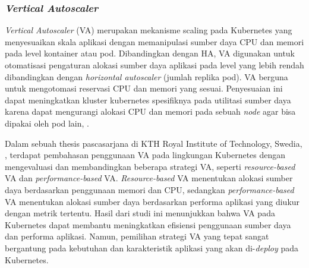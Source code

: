 \subsubsection{\textit{Vertical Autoscaler}}
\textit{Vertical Autoscaler} (VA) merupakan mekanisme scaling pada Kubernetes yang menyesuaikan skala aplikasi dengan memanipulasi sumber daya CPU dan memori pada level kontainer atau pod.
Dibandingkan dengan HA, VA digunakan untuk otomatisasi pengaturan alokasi sumber daya aplikasi pada level yang lebih rendah dibandingkan dengan \textit{horizontal autoscaler} (jumlah replika pod).
VA berguna untuk mengotomasi reservasi CPU dan memori yang sesuai. 
Penyesuaian ini dapat meningkatkan kluster kubernetes spesifiknya pada utilitasi sumber daya karena dapat mengurangi alokasi CPU dan memori pada sebuah \textit{node} agar bisa dipakai oleh pod lain, \parencite{vpa2}.

Dalam sebuah thesis pascasarjana di KTH Royal Institute of Technology, Swedia, \parencite{predictiveva}, terdapat pembahasan penggunaan VA pada lingkungan Kubernetes dengan mengevaluasi dan membandingkan beberapa strategi VA, seperti \textit{resource-based} VA dan \textit{performance-based} VA. \textit{Resource-based} VA menentukan alokasi sumber daya berdasarkan penggunaan memori dan CPU, sedangkan \textit{performance-based} VA menentukan alokasi sumber daya berdasarkan performa aplikasi yang diukur dengan metrik tertentu. Hasil dari studi ini menunjukkan bahwa VA pada Kubernetes dapat membantu meningkatkan efisiensi penggunaan sumber daya dan performa aplikasi. Namun, pemilihan strategi VA yang tepat sangat bergantung pada kebutuhan dan karakteristik aplikasi yang akan di-\textit{deploy} pada Kubernetes.



